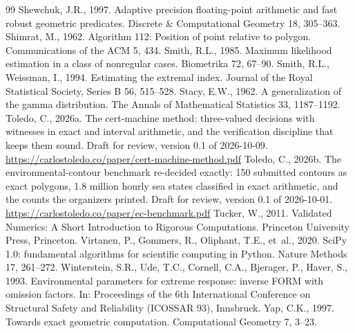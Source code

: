 \documentclass[preprint,11pt,authoryear]{elsarticle}
\begin{document}
\begin{thebibliography}{99}
 Shewchuk, J.R., 1997. Adaptive precision floating-point arithmetic and fast robust geometric predicates. Discrete \& Computational Geometry 18, 305--363.
 Shimrat, M., 1962. Algorithm 112: Position of point relative to polygon. Communications of the ACM 5, 434.
 Smith, R.L., 1985. Maximum likelihood estimation in a class of nonregular cases. Biometrika 72, 67--90.
 Smith, R.L., Weissman, I., 1994. Estimating the extremal index. Journal of the Royal Statistical Society, Series B 56, 515--528.
 Stacy, E.W., 1962. A generalization of the gamma distribution. The Annals of Mathematical Statistics 33, 1187--1192.
 Toledo, C., 2026a. The cert-machine method: three-valued decisions with witnesses in exact and interval arithmetic, and the verification discipline that keeps them sound. Draft for review, version 0.1 of 2026-10-09. \url{https://carlostoledo.co/paper/cert-machine-method.pdf}
 Toledo, C., 2026b. The environmental-contour benchmark re-decided exactly: 150 submitted contours as exact polygons, 1.8 million hourly sea states classified in exact arithmetic, and the counts the organizers printed. Draft for review, version 0.1 of 2026-10-01. \url{https://carlostoledo.co/paper/ec-benchmark.pdf}
 Tucker, W., 2011. Validated Numerics: A Short Introduction to Rigorous Computations. Princeton University Press, Princeton.
 Virtanen, P., Gommers, R., Oliphant, T.E., et~al., 2020. SciPy 1.0: fundamental algorithms for scientific computing in Python. Nature Methods 17, 261--272.
 Winterstein, S.R., Ude, T.C., Cornell, C.A., Bjerager, P., Haver, S., 1993. Environmental parameters for extreme response: inverse FORM with omission factors. In: Proceedings of the 6th International Conference on Structural Safety and Reliability (ICOSSAR 93), Innsbruck.
 Yap, C.K., 1997. Towards exact geometric computation. Computational Geometry 7, 3--23.
\end{thebibliography}
\end{document}
